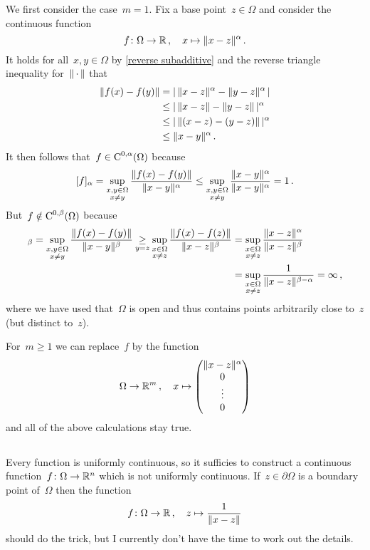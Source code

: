 We first consider the case~$m = 1$.
Fix a base point~$z \in \Omega$ and consider the continuous function
\[
          f
  \colon  \Omega
  \to     \mathbb{R} \,,
  \quad   x
  \mapsto \lVert x - z\rVert^\alpha \,.
\]
It holds for all~$x, y \in \Omega$ by \cref{reverse subadditive} and the reverse triangle inequality for~$\lVert\,\cdot\,\rVert$ that
\begin{align*}
        \lVert f(x) - f(y)\rVert
  &=    \lvert\, \lVert x-z\rVert^\alpha - \lVert y-z\rVert^\alpha \,\rvert \\
  &\leq \lvert \, \lVert x-z\rVert - \lVert y-z\rVert \, \rvert^\alpha  \\
  &\leq \lvert \, \lVert (x-z) - (y-z) \rVert \, \rvert^\alpha \\
  &\leq \lVert x-y\rVert^\alpha \,.
\end{align*}
It then follows that~$f \in \operatorname{C}^{0,\alpha}(\Omega)$ because
\[
        [f]_\alpha
  =     \sup_{\substack{x, y \in \Omega \\ x \neq y}}
        \frac{\lVert f(x) - f(y)\rVert}{\lVert x-y\rVert^\alpha}
  \leq  \sup_{\substack{x, y \in \Omega \\ x \neq y}}
        \frac{\lVert x-y\rVert^\alpha}{\lVert x-y\rVert^\alpha}
  =     1 \,.
\]
But~$f \notin \operatorname{C}^{0,\beta}(\Omega)$ because
\begin{align*}
    [f]_\beta
   =
    \sup_{\substack{x, y \in \Omega \\ x \neq y}}
    \frac{\norm{f(x) - f(y)}}{\norm{x-y}^\beta}
   \mathbin{\underset{y=z}{\geq}}
    \sup_{\substack{x \in \Omega \\ x \neq z}}
    \frac{\norm{f(x) - f(z)}}{\norm{x-z}^\beta}
  &=
    \sup_{\substack{x \in \Omega \\ x \neq z}}
    \frac{\norm{x-z}^\alpha}{\norm{x-z}^\beta}  \\
  &=
    \sup_{\substack{x \in \Omega \\ x \neq z}}
    \frac{1}{\norm{x-z}^{\beta - \alpha}}
   =
    \infty \,,
\end{align*}
where we have used that~$\Omega$ is open and thus contains points arbitrarily close to~$z$ (but distinct to~$z$).

For~$m \geq 1$ we can replace~$f$ by the function
\[
          \Omega
  \to     \mathbb{R}^m \,,
  \quad   x
  \mapsto \begin{pmatrix}  \lVert x-z\rVert^\alpha \\ 0 \\ \vdots \\ 0  \end{pmatrix}
\]
and all of the above calculations stay true.





\subsection{}

Every  function is uniformly continuous, so it sufficies to construct a continuous function~$f \colon \Omega \to \mathbb{R}^n$ which is not uniformly continuous.
If~$z \in \partial \Omega$ is a boundary point of~$\Omega$ then the function
\[
          f
  \colon  \Omega
  \to     \mathbb{R} \,,
  \quad   z
  \mapsto \frac{1}{\lVert x-z\rVert}
\]
should do the trick, but I currently don’t have the time to work out the details.



